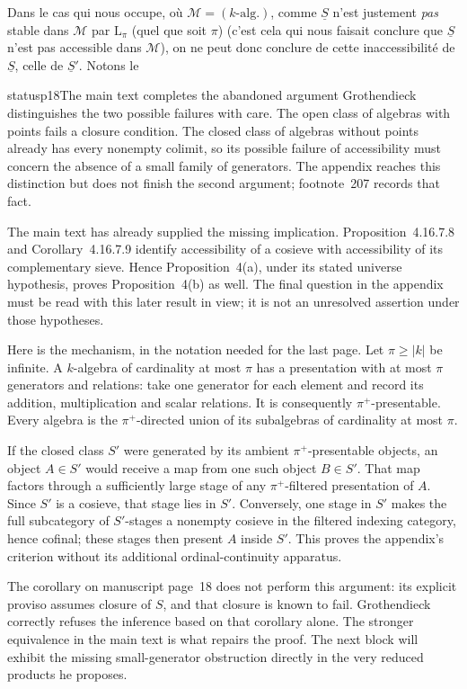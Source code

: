 Dans le cas qui nous occupe, où $\mathcal{M}=(k\text{-alg.})$, comme $\underline{S}$ n'est justement \textit{pas} stable dans $\mathcal{M}$ par $\mathrm{L}_\pi$ (quel que soit $\pi$) (c'est cela qui nous faisait conclure que
$\underline{S}$ n'est pas accessible dans $\mathcal{M}$), on ne peut donc conclure de cette inaccessibilité de $\underline{S}$, celle de $\underline{S}'$. Notons le

\begin{dcomment}{status}{p18}{The main text completes the abandoned argument}
Grothendieck distinguishes the two possible failures with care. The open class of algebras with points fails a closure condition. The closed class of algebras without points already has every nonempty colimit, so its possible failure of accessibility must concern the absence of a small family of generators. The appendix reaches this distinction but does not finish the second argument; footnote~207 records that fact.

The main text has already supplied the missing implication. Proposition~4.16.7.8 and Corollary~4.16.7.9 identify accessibility of a cosieve with accessibility of its complementary sieve. Hence Proposition~4(a), under its stated universe hypothesis, proves Proposition~4(b) as well. The final question in the appendix must be read with this later result in view; it is not an unresolved assertion under those hypotheses.

Here is the mechanism, in the notation needed for the last page. Let $\pi\ge|k|$ be infinite. A $k$-algebra of cardinality at most $\pi$ has a presentation with at most $\pi$ generators and relations: take one generator for each element and record its addition, multiplication and scalar relations. It is consequently $\pi^+$-presentable. Every algebra is the $\pi^+$-directed union of its subalgebras of cardinality at most $\pi$.

If the closed class $S'$ were generated by its ambient $\pi^+$-presentable objects, an object $A\in S'$ would receive a map from one such object $B\in S'$. That map factors through a sufficiently large stage of any $\pi^+$-filtered presentation of $A$. Since $S'$ is a cosieve, that stage lies in $S'$. Conversely, one stage in $S'$ makes the full subcategory of $S'$-stages a nonempty cosieve in the filtered indexing category, hence cofinal; these stages then present $A$ inside $S'$. This proves the appendix's criterion without its additional ordinal-continuity apparatus.

The corollary on manuscript page~18 does not perform this argument: its explicit proviso assumes closure of $S$, and that closure is known to fail. Grothendieck correctly refuses the inference based on that corollary alone. The stronger equivalence in the main text is what repairs the proof. The next block will exhibit the missing small-generator obstruction directly in the very reduced products he proposes.
\end{dcomment}


